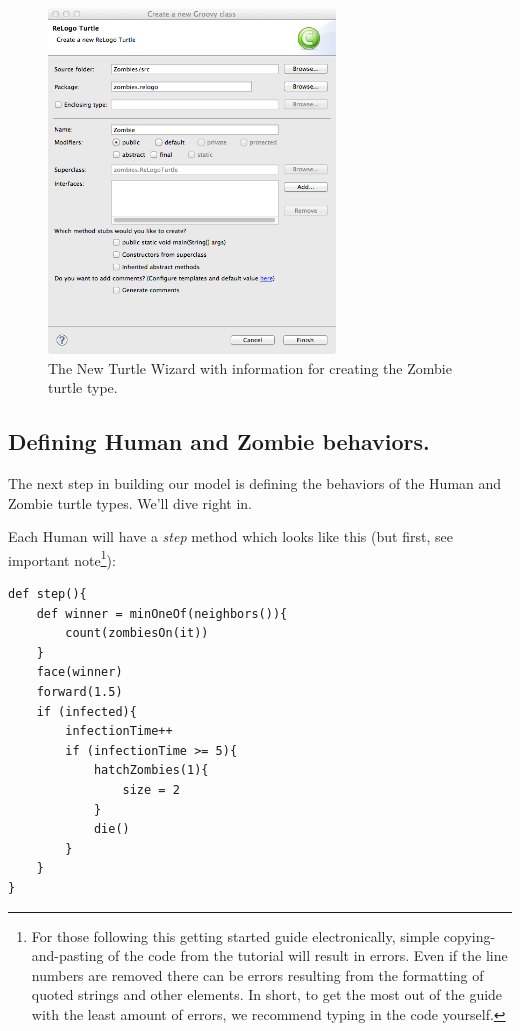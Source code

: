 \documentclass[11pt]{amsart}
\begin{document}
\begin{figure}
\begin{center}
\vspace{.2in}
\centerline {
\includegraphics[width=3in]{GettingStartedImages/Zombie1.png}
}
\caption{The New Turtle Wizard with information for creating the Zombie turtle type.}
\label{fig:zombiewizard}
\end{center}
\end{figure}

\clearpage
\subsection{Defining Human and Zombie behaviors.}
The next step in building our model is defining the behaviors of the Human and Zombie turtle types. We'll dive right in. 

Each Human will have a \emph{step} method which looks like this (but first, see important note\footnote{For those following this getting started guide electronically, simple copying-and-pasting of the code from the tutorial will result in errors. Even if the line numbers are removed there can be errors resulting from the formatting of quoted strings and other elements. In short, to get the most out of the guide with the least amount of errors, we recommend typing in the code yourself.}):

\noindent\begin{minipage}[h]{\textwidth}
\vspace{.2in}
\lstset{language=java,caption=Human step method.,label=lst:humanstep}
\begin{lstlisting}
def step(){
	def winner = minOneOf(neighbors()){
		count(zombiesOn(it))
	}
	face(winner)
	forward(1.5)
	if (infected){
		infectionTime++
		if (infectionTime >= 5){
			hatchZombies(1){
				size = 2
			}
			die()
		}
	}
}
\end{lstlisting}
\vspace{.2in}
\end{minipage}
\end{document}
